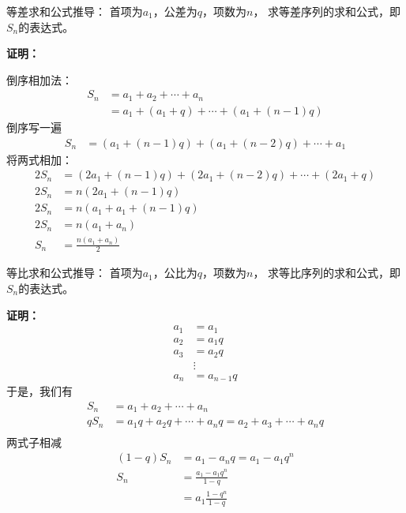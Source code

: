 \documentclass{article}
\begin{document}
\begin{zremark}
    等差求和公式推导： 首项为$a_1$，公差为$q$，项数为$n$，
    求等差序列的求和公式，即$S_n$的表达式。
\end{zremark}

\textbf{证明：}

倒序相加法：
\begin{align*}
    S_n & = a_1 + a_2 + \cdots + a_n                    \\
        & = a_1 + (a_1 + q) + \cdots + (a_1 + (n - 1)q)
\end{align*}
倒序写一遍
\begin{align*}
    S_n & = (a_1 + (n - 1)q) + (a_1 + (n - 2)q) + \cdots + a_1
\end{align*}
将两式相加：
\begin{align*}
    2S_n & = (2a_1 + (n - 1)q) + (2a_1 + (n - 2)q) + \cdots + (2a_1 + q) \\
    2S_n & = n(2a_1 + (n - 1)q)                                          \\
    2S_n & = n(a_1 + a_1 + (n - 1)q)                                     \\
    2S_n & = n(a_1 + a_n)                                                \\
    S_n  & = \frac{n(a_1 + a_n)}{2}
\end{align*}


\begin{zremark}
    等比求和公式推导： 首项为$a_1$，公比为$q$，项数为$n$，
    求等比序列的求和公式，即$S_n$的表达式。
\end{zremark}

\textbf{证明：}
\begin{align*}
    a_1 & = a_1       \\
    a_2 & = a_1 q     \\
    a_3 & = a_2 q     \\
        & \vdots      \\
    a_n & = a_{n-1} q
\end{align*}
于是，我们有
\begin{align*}
    S_n   & = a_1 + a_2 + \cdots + a_n                                    \\
    q S_n & = a_1 q + a_2 q + \cdots + a_n q = a_2 + a_3 + \cdots + a_n q \\
\end{align*}
两式子相减
\begin{align*}
    (1 - q) S_n & = a_1 - a_n q = a_1 - a_1 q^n \\
    S_n         & = \frac{a_1 - a_1 q^n}{1 - q} \\
                & = a_1 \frac{1 - q^n}{1 - q}
\end{align*}
\end{document}
